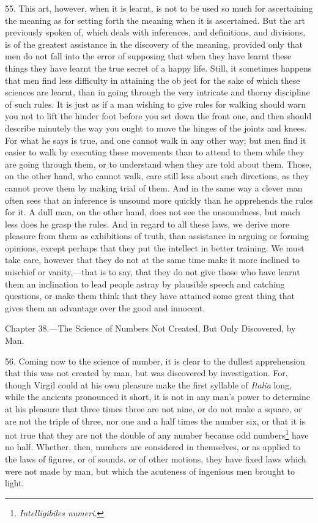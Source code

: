 55. This art, however, when it is learnt, is not to be used so much for ascertaining the meaning as for setting forth the meaning when it is ascertained. But the art previously spoken of, which deals with inferences, and definitions, and divisions, is of the greatest assistance in the discovery of the meaning, provided only that men do not fall into the error of supposing that when they have learnt these things they have learnt the true secret of a happy life. Still, it sometimes happens that men find less difficulty in attaining the ob  ject for the sake of which these sciences are learnt, than in going through the very intricate and thorny discipline of such rules. It is just as if a man wishing to give rules for walking should warn you not to lift the hinder foot before you set down the front one, and then should describe minutely the way you ought to move the hinges of the joints and knees. For what he says is true, and one cannot walk in any other way; but men find it easier to walk by executing these movements than to attend to them while they are going through them, or to understand when they are told about them. Those, on the other hand, who cannot walk, care still less about such directions, as they cannot prove them by making trial of them. And in the same way a clever man often sees that an inference is unsound more quickly than he apprehends the rules for it. A dull man, on the other hand, does not see the unsoundness, but much less does he grasp the rules. And in regard to all these laws, we derive more pleasure from them as exhibitions of truth, than assistance in arguing or forming opinions, except perhaps that they put the intellect in better training. We must take care, however that they do not at the same time make it more inclined to mischief or vanity,—that is to say, that they do not give those who have learnt them an inclination to lead people astray by plausible speech and catching questions, or make them think that they have attained some great thing that gives them an advantage over the good and innocent.


Chapter 38.—The Science of Numbers Not Created, But Only Discovered, by Man.

56. Coming now to the science of number, it is clear to the dullest apprehension that this was not created by man, but was discovered by investigation. For, though Virgil could at his own pleasure make the first syllable of \emph{ Italia} long, while the ancients pronounced it short, it is not in any man’s power to determine at his pleasure that three times three are not nine, or do not make a square, or are not the triple of three, nor one and a half times the number six, or that it is not true that they are not the double of any number because odd numbers\footnote{\emph{Intelligibiles numeri}.} have no half. Whether, then, numbers are considered in themselves, or as applied to the laws of figures, or of sounds, or of other motions, they have fixed laws which were not made by man, but which the acuteness of ingenious men brought to light.

